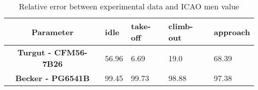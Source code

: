 \begin{table}[h!]
  \centering
  \begin{tabularx}{\textwidth}{||c|X|X|X|X||}
  \hline
    \cellcolor{gray!20}\textbf{Parameter} & \cellcolor{gray!20}\textbf{idle} & \cellcolor{gray!20}\textbf{take-off} & \cellcolor{gray!20}\textbf{climb-out} & \cellcolor{gray!20}\textbf{approach} \\ [0.5ex]
  \hline\hline
\centering
    \cellcolor{gray!20}\textbf{Turgut - CFM56-7B26} & 56.96 & 6.69 & 19.0 & 68.39 \\
  \hline
    \cellcolor{gray!20}\textbf{Becker - PG6541B} & 99.45 & 99.73 & 98.88 & 97.38 \\
  \hline
  \end{tabularx}
  \caption{Relative error between experimental data and ICAO men value}
  \label{tab:relee}
\end{table}

